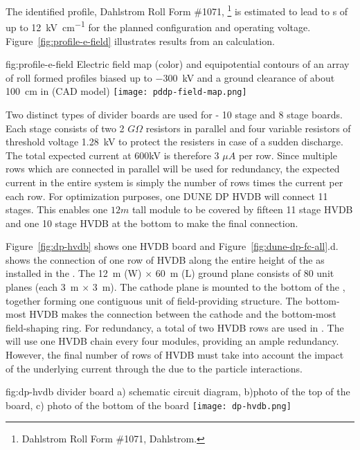 The identified profile, Dahlstrom Roll Form \#1071,
\footnote{Dahlstrom Roll Form \#1071, Dahlstrom\texttrademark{}.}  is estimated to lead to \efield{}s of up to \SI{12}{\kV\per\cm}  
for the planned \fc configuration and operating voltage. Figure~\ref{fig:profile-e-field} illustrates results from an \efield calculation.


\begin{dunefigure}
{fig:profile-e-field}
{Electric field map (color) and equipotential contours of an array of roll formed profiles biased up to \SI{-300}{\kV} and a ground clearance of about \SI{100}{\cm} in (CAD model)} \texttt{[image: pddp-field-map.png]}
\end{dunefigure}

Two distinct types of \hv divider boards are used for  - 10 stage and 8 stage boards.  Each stage consists of two 2 $G\Omega$ resistors in parallel and four variable resistors of threshold voltage \SI{1.28}{kV} to protect the resisters in case of a sudden discharge.  The total expected current at 600kV is therefore 3 $\mu A$ per row.  Since multiple rows which are connected in parallel will be used for redundancy, the expected current in the entire system is simply the number of rows times the current per each row.
For optimization purposes, one DUNE DP HVDB will connect 11 stages.  This enables  one $12m$ tall module to be covered by fifteen 11 stage HVDB and one 10 stage HVDB at the bottom to make the final connection.  


Figure~\ref{fig:dp-hvdb} shows one HVDB board and  Figure~\ref{fig:dune-dp-fc-all}.d. shows the connection of one row of HVDB along the entire height of the \fc as installed in the . The  \SI{12}{\m} (W) $\times$ \SI{60}{\m} (L) ground plane consists of 80 unit planes (each \SI{3}{\m} $\times$ \SI{3}{\m}).  
The cathode plane is mounted to the bottom of the \fc, together forming one contiguous unit of field-providing structure.  The bottom-most HVDB makes the connection between the cathode and the bottom-most field-shaping ring.
For redundancy, a total of two HVDB rows are used in .  
The \dpmod will use one HVDB chain every four \fc modules, providing an ample redundancy.  However, the final number of rows of HVDB must take into account the impact of the underlying current through the \fc due to the particle interactions.


\begin{dunefigure}[DP HVDB]{fig:dp-hvdb}{  divider board a) schematic circuit diagram, b)photo of the top of the board, c) photo of the bottom of the board}
\texttt{[image: dp-hvdb.png]}
\end{dunefigure}



